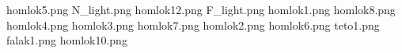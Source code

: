 homlok5.png
N_light.png
homlok12.png
F_light.png
homlok1.png
homlok8.png
homlok4.png
homlok3.png
homlok7.png
homlok2.png
homlok6.png
teto1.png
falak1.png
homlok10.png
